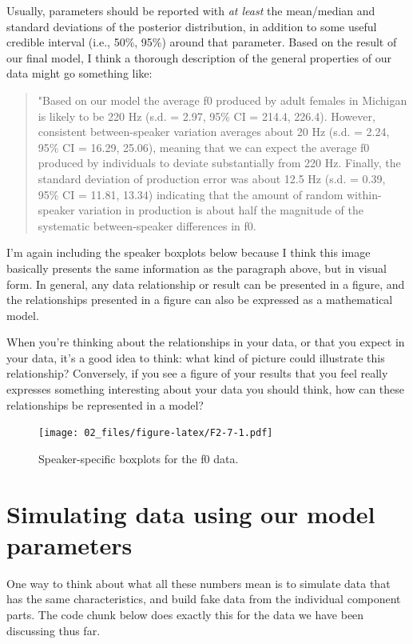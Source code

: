 \documentclass[
]{book}
\begin{document}
Usually, parameters should be reported with \emph{at least} the mean/median and standard deviations of the posterior distribution, in addition to some useful credible interval (i.e., 50\%, 95\%) around that parameter. Based on the result of our final model, I think a thorough description of the general properties of our data might go something like:

\begin{quote}
"Based on our model the average f0 produced by adult females in Michigan is likely to be 220 Hz (s.d. = 2.97, 95\% CI = 214.4, 226.4). However, consistent between-speaker variation averages about 20 Hz (s.d. = 2.24, 95\% CI = 16.29, 25.06), meaning that we can expect the average f0 produced by individuals to deviate substantially from 220 Hz. Finally, the standard deviation of production error was about 12.5 Hz (s.d. = 0.39, 95\% CI = 11.81, 13.34) indicating that the amount of random within-speaker variation in production is about half the magnitude of the systematic between-speaker differences in f0.
\end{quote}

I'm again including the speaker boxplots below because I think this image basically presents the same information as the paragraph above, but in visual form. In general, any data relationship or result can be presented in a figure, and the relationships presented in a figure can also be expressed as a mathematical model.

When you're thinking about the relationships in your data, or that you expect in your data, it's a good idea to think: what kind of picture could illustrate this relationship? Conversely, if you see a figure of your results that you feel really expresses something interesting about your data you should think, how can these relationships be represented in a model?

\begin{figure}
\centering
\texttt{[image: 02\_files/figure-latex/F2-7-1.pdf]}
\caption{\label{fig:F2-7}Speaker-specific boxplots for the f0 data.}
\end{figure}

\hypertarget{simulating-data-using-our-model-parameters}{%
\section{Simulating data using our model parameters}\label{simulating-data-using-our-model-parameters}}

One way to think about what all these numbers mean is to simulate data that has the same characteristics, and build fake data from the individual component parts. The code chunk below does exactly this for the data we have been discussing thus far.
\end{document}
